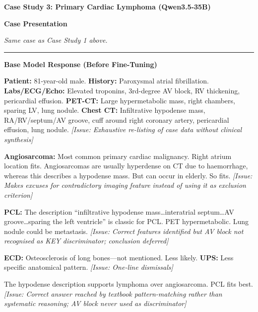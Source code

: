 \documentclass[10pt,journal,compsoc, onecolumn]{IEEEtran}
\begin{document}
\vspace{1em}

\begin{casebox}
    \textbf{Case Study 3: Primary Cardiac Lymphoma (Qwen3.5-35B)}

    \vspace{1em}
    \textbf{Case Presentation}

    \textit{Same case as Case Study 1 above.}

    \vspace{1em}
    \hrule
    \vspace{1em}

    \textbf{Base Model Response (Before Fine-Tuning)}

    \vspace{0.5em}
    \textbf{Patient:} 81-year-old male. \textbf{History:} Paroxysmal atrial fibrillation. \textbf{Labs/ECG/Echo:} Elevated troponins, 3rd-degree AV block, RV thickening, pericardial effusion. \textbf{PET-CT:} Large hypermetabolic mass, right chambers, sparing LV, lung nodule. \textbf{Chest CT:} Infiltrative hypodense mass, RA/RV/septum/AV groove, cuff around right coronary artery, pericardial effusion, lung nodule. \textit{[Issue: Exhaustive re-listing of case data without clinical synthesis]}

    \vspace{0.5em}
    \textbf{Angiosarcoma:} Most common primary cardiac malignancy. Right atrium location fits. Angiosarcomas are usually hyperdense on CT due to haemorrhage, whereas this describes a hypodense mass. But can occur in elderly. So fits. \textit{[Issue: Makes excuses for contradictory imaging feature instead of using it as exclusion criterion]}

    \vspace{0.5em}
    \textbf{PCL:} The description ``infiltrative hypodense mass\ldots interatrial septum\ldots AV groove\ldots sparing the left ventricle'' is classic for PCL. PET hypermetabolic. Lung nodule could be metastasis. \textit{[Issue: Correct features identified but AV block not recognised as KEY discriminator; conclusion deferred]}

    \vspace{0.5em}
    \textbf{ECD:} Osteosclerosis of long bones---not mentioned. Less likely. \textbf{UPS:} Less specific anatomical pattern. \textit{[Issue: One-line dismissals]}

    \vspace{0.5em}
    The hypodense description supports lymphoma over angiosarcoma. PCL fits best. \textit{[Issue: Correct answer reached by textbook pattern-matching rather than systematic reasoning; AV block never used as discriminator]}


\end{casebox}
\end{document}
